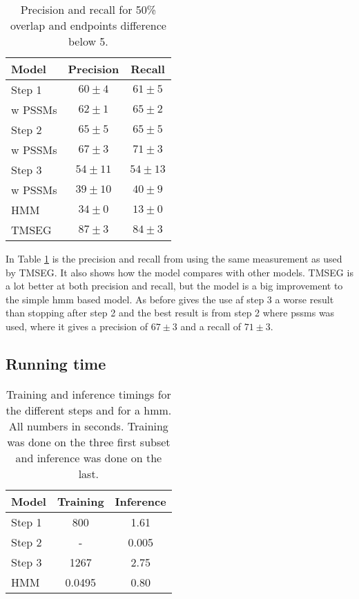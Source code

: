 \begin{table}
	\centering 
	\begin{tabular}{l|c|c} 
		Model & Precision & Recall \\ \hline
		Step 1 & $60 \pm 4$ & $61 \pm 5$ \\
		w PSSMs& $62 \pm 1$ & $65 \pm 2$ \\
		Step 2 & $65 \pm 5$ & $65 \pm 5$ \\
		w PSSMs& $67 \pm 3$ & $71 \pm 3$ \\
		Step 3 & $54 \pm 11$ & $54 \pm 13$ \\
		w PSSMs& $39 \pm 10$ & $40 \pm 9$ \\
		HMM   & $34 \pm 0$ & $13 \pm 0$ \\ 
		TMSEG\cite{tmseg} & $87 \pm 3$ & $84 \pm 3$
	\end{tabular}
    \caption{Precision and recall for 50\% overlap and endpoints difference below 5.}
	\label{tab:pr50}
\end{table}

In Table \ref{tab:pr50} is the precision and recall from using the same 
measurement as used by TMSEG. It also shows how the model compares with 
other models. TMSEG is a lot better at both precision and recall, 
but the model is a big improvement to the simple \gls{hmm}
based model. As before gives the use af step 3 a worse result than stopping
after step 2 and the best result is from step 2 where \glspl{pssm} was 
used, where it gives a precision of $67 \pm 3$ and a recall of $71 \pm 3$.

\subsection{Running time}
\label{sec:time}



\begin{table}
	\centering 
	\begin{tabular}{l|c|c} 
		Model & Training & Inference \\ \hline
		Step 1 & 800 & 1.61 \\ 
		Step 2 & - & 0.005 \\ 
		Step 3 & 1267 & 2.75 \\
		HMM   & 0.0495 & 0.80
	\end{tabular}
	\caption{Training and inference timings for the different steps 
		and for a \gls{hmm}. All numbers in seconds. Training was done
		on the three first subset and inference was done on the last.}
	\label{tab:time}
\end{table}

